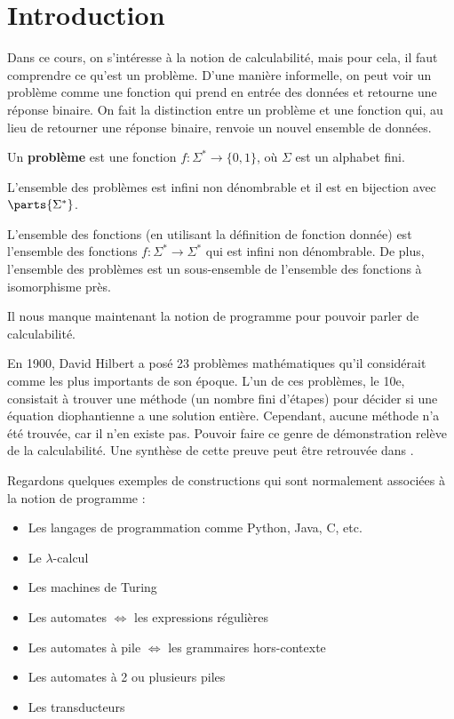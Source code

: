 
\section{Introduction}


Dans ce cours, on s'intéresse à la notion de calculabilité, mais pour cela, il faut comprendre ce qu'est un problème.
D'une manière informelle, on peut voir un problème comme une fonction qui prend en entrée des données et retourne une réponse binaire.
On fait la distinction entre un problème et une fonction qui, au lieu de retourner une réponse binaire, renvoie un nouvel ensemble de données.
\begin{definition}
	Un \textbf{problème} est une fonction $f: \Sigma^* \to \{0, 1\}$, où $\Sigma$ est un alphabet fini.
\end{definition}

\begin{remarque}
	L'ensemble des problèmes est infini non dénombrable et il est en bijection avec $\parts {\Sigma^*}$.
\end{remarque}

\begin{remarque}
	L'ensemble des fonctions (en utilisant la définition de fonction donnée) est l'ensemble des fonctions $f: \Sigma^* \to \Sigma^*$ qui est infini non dénombrable.
	De plus, l'ensemble des problèmes est un sous-ensemble de l'ensemble des fonctions à isomorphisme près.
\end{remarque}

Il nous manque maintenant la notion de programme pour pouvoir parler de calculabilité.

En 1900, David Hilbert a posé 23 problèmes mathématiques qu'il considérait comme les plus importants de son époque. L'un de ces problèmes, le 10e, consistait à trouver
une méthode (un nombre fini d'étapes) pour décider si une équation diophantienne a une solution entière. Cependant, aucune méthode n'a été trouvée, car il n'en existe pas.
Pouvoir faire ce genre de démonstration relève de la calculabilité. Une synthèse de cette preuve peut être retrouvée dans \cite{Hilbert10}.

Regardons quelques exemples de constructions qui sont normalement associées à la notion de programme :

\begin{itemize}
	\item Les langages de programmation comme Python, Java, C, etc. 
	\item Le $\lambda$-calcul 
	\item Les machines de Turing 
	\item Les automates $\iff$ les expressions régulières 
	\item Les automates à pile $\iff$ les grammaires hors-contexte 
	\item Les automates à 2 ou plusieurs piles 
	\item Les transducteurs
\end{itemize}

